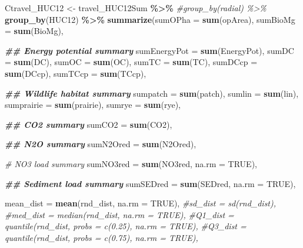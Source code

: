 \documentclass[
]{article}
\newenvironment{Shaded}{\begin{snugshade}}{\end{snugshade}}
\newcommand{\AttributeTok}[1]{\textcolor[rgb]{0.13,0.29,0.53}{#1}}
\newcommand{\CommentTok}[1]{\textcolor[rgb]{0.56,0.35,0.01}{\textit{#1}}}
\newcommand{\ConstantTok}[1]{\textcolor[rgb]{0.56,0.35,0.01}{#1}}
\newcommand{\DocumentationTok}[1]{\textcolor[rgb]{0.56,0.35,0.01}{\textbf{\textit{#1}}}}
\newcommand{\FunctionTok}[1]{\textcolor[rgb]{0.13,0.29,0.53}{\textbf{#1}}}
\newcommand{\NormalTok}[1]{#1}
\newcommand{\OtherTok}[1]{\textcolor[rgb]{0.56,0.35,0.01}{#1}}
\newcommand{\SpecialCharTok}[1]{\textcolor[rgb]{0.81,0.36,0.00}{\textbf{#1}}}
\begin{document}
\begin{Shaded}
\begin{Highlighting}[]
\NormalTok{Ctravel\_HUC12 }\OtherTok{\textless{}{-}}\NormalTok{ travel\_HUC12Sum }\SpecialCharTok{\%\textgreater{}\%}
  \CommentTok{\#group\_by(radial) \%\textgreater{}\%}
  \FunctionTok{group\_by}\NormalTok{(HUC12) }\SpecialCharTok{\%\textgreater{}\%}
  \FunctionTok{summarize}\NormalTok{(}\AttributeTok{sumOPha =} \FunctionTok{sum}\NormalTok{(opArea),}
            \AttributeTok{sumBioMg =} \FunctionTok{sum}\NormalTok{(BioMg),}
            
            \DocumentationTok{\#\# Energy potential summary}
            \AttributeTok{sumEnergyPot =} \FunctionTok{sum}\NormalTok{(EnergyPot),}
            \AttributeTok{sumDC =} \FunctionTok{sum}\NormalTok{(DC),}
            \AttributeTok{sumOC =} \FunctionTok{sum}\NormalTok{(OC),}
            \AttributeTok{sumTC =} \FunctionTok{sum}\NormalTok{(TC),}
            \AttributeTok{sumDCcp =} \FunctionTok{sum}\NormalTok{(DCcp),}
            \AttributeTok{sumTCcp =} \FunctionTok{sum}\NormalTok{(TCcp),}
            
            \DocumentationTok{\#\# Wildlife habitat summary}
            \AttributeTok{sumpatch =} \FunctionTok{sum}\NormalTok{(patch),}
            \AttributeTok{sumlin =} \FunctionTok{sum}\NormalTok{(lin),}
            \AttributeTok{sumprairie =} \FunctionTok{sum}\NormalTok{(prairie),}
            \AttributeTok{sumrye =} \FunctionTok{sum}\NormalTok{(rye),}
            
            \DocumentationTok{\#\# CO2 summary}
            \AttributeTok{sumCO2 =} \FunctionTok{sum}\NormalTok{(CO2),}
            
            \DocumentationTok{\#\# N2O summary}
            \AttributeTok{sumN2Ored =} \FunctionTok{sum}\NormalTok{(N2Ored),}

            \CommentTok{\# NO3 load summary}
            \AttributeTok{sumNO3red =} \FunctionTok{sum}\NormalTok{(NO3red, }\AttributeTok{na.rm =} \ConstantTok{TRUE}\NormalTok{),}

            \DocumentationTok{\#\# Sediment load summary}
            \AttributeTok{sumSEDred =} \FunctionTok{sum}\NormalTok{(SEDred, }\AttributeTok{na.rm =} \ConstantTok{TRUE}\NormalTok{),}
            
            \AttributeTok{mean\_dist =} \FunctionTok{mean}\NormalTok{(rnd\_dist, }\AttributeTok{na.rm =} \ConstantTok{TRUE}\NormalTok{),}
            \CommentTok{\#sd\_dist = sd(rnd\_dist),}
            \CommentTok{\#med\_dist = median(rnd\_dist, na.rm = TRUE),}
            \CommentTok{\#Q1\_dist = quantile(rnd\_dist, probs = c(0.25), na.rm = TRUE),}
            \CommentTok{\#Q3\_dist = quantile(rnd\_dist, probs = c(0.75), na.rm = TRUE),}
            

\end{Highlighting}
\end{Shaded}
\end{document}

